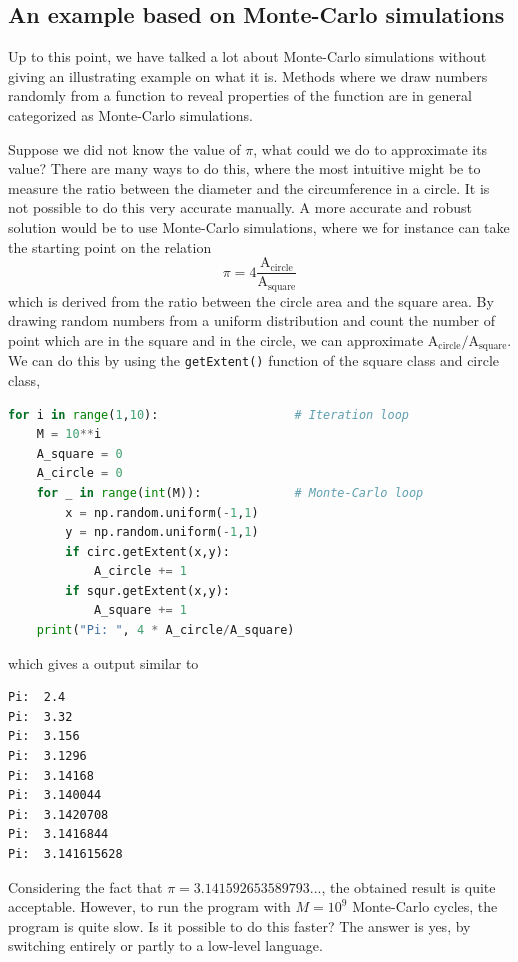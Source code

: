 \subsection{An example based on Monte-Carlo simulations}
Up to this point, we have talked a lot about Monte-Carlo simulations without giving an illustrating example on what it is. Methods where we draw numbers randomly from a function to reveal properties of the function are in general categorized as Monte-Carlo simulations. 

Suppose we did not know the value of $\pi$, what could we do to approximate its value? There are many ways to do this, where the most intuitive might be to measure the ratio between the diameter and the circumference in a circle. It is not possible to do this very accurate manually. A more accurate and robust solution would be to use Monte-Carlo simulations, where we for instance can take the starting point on the relation
\begin{equation}
\pi=4\frac{\text{A}_{\text{circle}}}{\text{A}_{\text{square}}}
\end{equation}
which is derived from the ratio between the circle area and the square area. By drawing random numbers from a uniform distribution and count the number of point which are in the square and in the circle, we can approximate $\text{A}_{\text{circle}}/\text{A}_{\text{square}}$. We can do this by using the \texttt{getExtent()} function of the square class and circle class,
\lstset{basicstyle=\scriptsize}
\begin{lstlisting}[language=python]
for i in range(1,10):					# Iteration loop
	M = 10**i
	A_square = 0
	A_circle = 0
	for _ in range(int(M)):				# Monte-Carlo loop
		x = np.random.uniform(-1,1)
		y = np.random.uniform(-1,1)
		if circ.getExtent(x,y):
			A_circle += 1
		if squr.getExtent(x,y):
			A_square += 1
	print("Pi: ", 4 * A_circle/A_square)
\end{lstlisting}
which gives a output similar to
\begin{lstlisting}
Pi:  2.4
Pi:  3.32
Pi:  3.156
Pi:  3.1296
Pi:  3.14168
Pi:  3.140044
Pi:  3.1420708
Pi:  3.1416844
Pi:  3.141615628
\end{lstlisting}
Considering the fact that $\pi=3.141592653589793...$, the obtained result is quite acceptable. However, to run the program with $M=10^9$ Monte-Carlo cycles, the program is quite slow. Is it possible to do this faster? The answer is yes, by switching entirely or partly to a low-level language.

